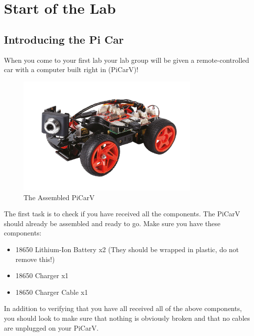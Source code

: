 \documentclass[12pt]{report} %
\begin{document}
    \clearpage

    \chapter{Start of the Lab}

    \section{Introducing the Pi Car}
    When you come to your first lab your lab group will be given a remote-controlled car with a computer built right in (PiCarV)! 

    \begin{figure}[h]
        \centering
        \includegraphics[width=0.8\textwidth]{picarv.png}
        \caption{The Assembled PiCarV}
        \label{fig:The Assembled PiCarV}
    \end{figure}

    The first task is to check if you have received all the components. The PiCarV should already be assembled and ready to go. Make sure you have these components:

    \begin{itemize}
        \item 18650 Lithium-Ion Battery x2 (They should be wrapped in plastic, do not remove this!)
        \item 18650 Charger x1
        \item 18650 Charger Cable x1
    \end{itemize}

    In addition to verifying that you have all received all of the above components, you should look to make sure that nothing is obviously broken and that no cables are unplugged on your PiCarV.
\end{document}
